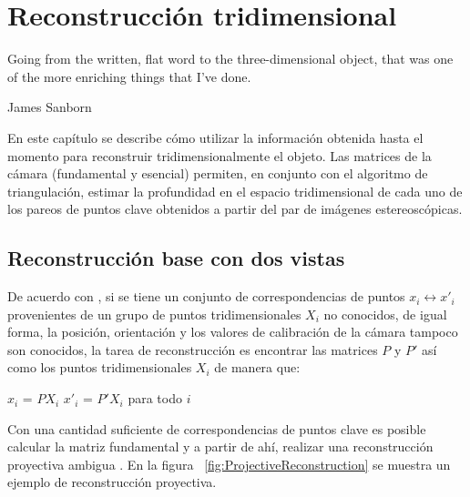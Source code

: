 \chapter{Reconstrucci\'{o}n tridimensional}
\label{chap:reconstruccion}
\epigraph{Going from the written, flat word to the three-dimensional object, that was one of the more enriching things that I've done.}{James Sanborn}

En este cap\'{i}tulo se describe c\'{o}mo utilizar la informaci\'{o}n obtenida hasta el momento para reconstruir tridimensionalmente el objeto. Las matrices de la c\'{a}mara (fundamental y esencial) permiten, en conjunto con el algoritmo de triangulaci\'{o}n, estimar la profundidad en el espacio tridimensional de cada uno de los pareos de puntos clave obtenidos a partir del par de im\'{a}genes estereosc\'{o}picas.

\section{Reconstrucci\'{o}n base con dos vistas}
De acuerdo con \cite{Hartley_Zisserman_2003}, si se tiene un conjunto de correspondencias de puntos $x_i \leftrightarrow 
 x'_i$ provenientes de un grupo de puntos tridimensionales $X_i$ no conocidos, de igual forma, la posici\'{o}n, orientaci\'{o}n y los valores de calibraci\'{o}n de la c\'{a}mara tampoco son conocidos, la tarea de reconstrucci\'{o}n es encontrar las matrices \textit{$P$} y \textit{$P'$} as\'{i} como los puntos tridimensionales \textit{$X_i$} de manera que:

\vspace{5 mm}
\begin{center}
\textbf{\textit{$x_i$}} = \textbf{\textit{$PX_i$}} 
\textbf{\textit{$x'_i$}} = \textbf{\textit{$P'X_i$}}
para todo \textit{$i$}
\end{center}
\vspace{5 mm}

Con una cantidad suficiente de correspondencias de puntos clave es posible calcular la matriz fundamental y a partir de ah\'{i}, realizar una reconstrucci\'{o}n proyectiva ambigua \cite{hartley1997triangulation,Hartley_Zisserman_2003,Faugeras_1993}. En la figura ~\ref{fig:ProjectiveReconstruction} se muestra un ejemplo de reconstrucci\'{o}n proyectiva.


